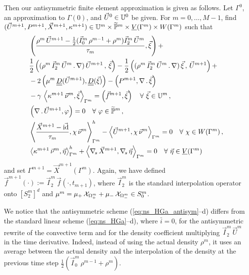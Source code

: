 Then our antisymmetric finite element approximation is
given as follows. Let $\Gamma^0$, an approximation to $\Gamma(0)$, and $\vec
U^0\in \mathbb{U}^0$ be given. For $m=0,\ldots, M-1$, find $(\vec U^{m+1},P^{m+1},
\vec{X}^{m+1}, \kappa^{m+1}) \in \mathbb{U}^m\times \widetilde{\mathbb{P}}^m \times \underline{V}(\Gamma^m) \times
W(\Gamma^m)$ such that
\begin{subequations}
\begin{align}
& \left(\frac{\rho^{m}\,\vec U^{m+1} - \tfrac{1}{2}(\vec I^m_0\,\rho^{m-1} +
\rho^m) \vec I^m_2\,\vec U^m}{\tau_m}, \vec \xi \right) + \nonumber \\
& \frac{1}{2}\left((\rho^{m}\,\vec I^m_2\,\vec U^{m}\,.\,\nabla)\,
\vec U^{m+1}\,,\,\vec \xi \right) - \frac{1}{2} \left((\rho^{m}\,
\vec I^m_2 \, \vec U^{m}\,.\,\nabla)\,\vec \xi\,,\,\vec U^{m+1} \right) +
\nonumber \\
& - 2\left(\mu^m\,\mat D(\vec U^{m+1}), \mat D(\vec \xi) \right)
- \left(P^{m+1}, \nabla\,.\,\vec \xi\right) \nonumber \\
& - \gamma\,\left\langle \kappa^{m+1}\,\vec\nu^m,\vec\xi\right\rangle_{\Gamma^m}
= \left(\vec f^{m+1}, \vec \xi\right)  \quad \forall\ \vec\xi \in \uspace^m\,,
\label{eq:ns_HGa_antisym} \\
& \left(\nabla\,.\,\vec U^{m+1}, \varphi\right)  = 0
\quad \forall\ \varphi \in \pnormspace^m\,,\label{eq:ns_HGb_antisym} \\
&  \left\langle \frac{\vec X^{m+1} - \vec\id}{\tau_m} ,\chi\,\vec\nu^m
\right\rangle_{\Gamma^m}^h - \left\langle \vec U^{m+1}, \chi\,\vec\nu^m
\right\rangle_{\Gamma^m}  = 0 \quad \forall\ \chi \in \Wh\,,
\label{eq:ns_HGc_antisym}\\
& \left\langle \kappa^{m+1}\,\vec\nu^m, \vec\eta \right\rangle_{\Gamma^m}^h
+ \left\langle \nabs\,\vec X^{m+1}, \nabs\,\vec \eta \right\rangle_{\Gamma^m} =
0 \quad \forall\ \vec\eta \in \Vh \label{eq:ns_HGd_antisym}
\end{align}
\end{subequations}
and set $\Gamma^{m+1} = \vec{X}^{m+1}(\Gamma^m)$. Again, we have defined $\vec
f^{m+1}(\cdot) := \vec I^m_2\,\vec f(\cdot,t_{m+1})$, where $\vec I^m_2$ is the
standard interpolation operator onto $[S^m_2]^d$ and
$\mu^m = \mu_+\,\mathrm{\mathcal{X}}_{\Omega^m_+} + \mu_-\,\mathrm{\mathcal{X}}_{\Omega^m_-} \in S^m_0$.

We notice that the antisymmetric scheme (\ref{eq:ns_HGa_antisym}--d) differs
from the standard linear scheme (\ref{eq:ns_HGa}--d), where $\bar{i}=0$, for
the antisymmetric rewrite of the convective term and for the density
coefficient multiplying $\vec I^m_2\,\vec U^{m}$ in the time derivative.
Indeed, instead of using the actual density $\rho^m$, it uses an average
between the actual density and the interpolation of the density at the previous
time step $\tfrac{1}{2}(\vec I^m_0\,\rho^{m-1} + \rho^m)$.